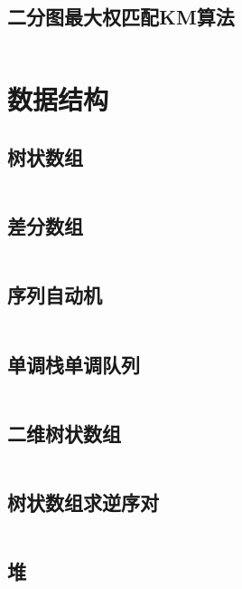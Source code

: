 \inputminted{text}{code/hungary.cc }

\subsection{二分图最大权匹配KM算法} 

\inputminted{cpp}{code/KM.cc}

\newpage\section{数据结构} 
\subsection{树状数组} 

\inputminted{cpp}{code/BIT.cc}

\subsection{差分数组} 

\inputminted{cpp}{code/differenceArray.cc}

\subsection{序列自动机} 

\inputminted{cpp}{code/序列自动机.cc}

\subsection{单调栈单调队列} 

\inputminted{cpp}{code/单调栈单调队列.cc}

\subsection{二维树状数组} 

\inputminted{cpp}{code/2DBIT.cc}

\subsection{树状数组求逆序对} 

\inputminted{cpp}{code/inversionPair.cc}

\subsection{堆} 

